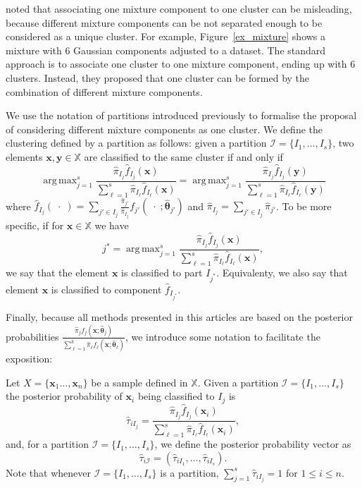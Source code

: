 \documentclass[10pt, a4paper]{article}
\DeclareMathOperator*{\argmax}{arg\,max}
\newcommand{\m}[1]{\boldsymbol{#1}}
\begin{document}
\cite{lee2004combining,hennig2010methods,baudry2010combining,melnykov2013distribution,pastore2013merging} noted that associating one mixture component to one cluster can be misleading, because different mixture components can be not separated enough to be considered as a unique cluster. For example, Figure~\ref{ex_mixture} shows  a mixture with 6 Gaussian components adjusted to a dataset. The standard approach is to associate one cluster to one mixture component, ending up with 6 clusters. Instead, they proposed that one cluster can be formed by the combination of different mixture components. 

We use the notation of partitions introduced previously to formalise the proposal of considering different mixture components as one cluster. We define the clustering defined by a partition as follows: given a partition $\mathcal{I} = \{ I_1, \dots, I_s\}$, two elements $\m x, \m y \in \mathbb{X}$ are classified to the same cluster if and only if
\begin{equation}\label{cluster_criteria}
\argmax_{j=1}^s \frac{ \hat{\pi}_{I_j} \hat{f}_{I_j}(\m x) }{\sum_{\ell=1}^s \hat{\pi}_{I_\ell} \hat{f}_{I_\ell}(\m x ) } = \argmax_{j=1}^s \frac{ \hat{\pi}_{I_j} \hat{f}_{I_j}(\m y) }{ \sum_{\ell=1}^s \hat{\pi}_{I_\ell} \hat{f}_{I_\ell}(\m y) }
\end{equation}
where $\hat{f}_{I_j}(\;\cdot\;) = \sum_{j' \in I_j} \frac{\hat{\pi}_{j'}}{\hat{\pi}_{I_j}} f_{j'}(\;\cdot\; ; \hat{\m\theta}_{j'})$ and $\hat{\pi}_{I_j} =  \sum_{j' \in I_j} \hat{\pi}_{j'}$. To be more specific,  if for $\m x \in \mathbb{X}$ we have
\[
j^* = \argmax_{j=1}^s \frac{ \hat{\pi}_{I_j} \hat{f}_{I_j}(\m x) }{\sum_{\ell=1}^s \hat{\pi}_{I_\ell} \hat{f}_{I_\ell}(\m x ) },
\]
we say that the element $\m x$ is classified to part $I_{j^*}$. Equivalenty, we also say that element $\m x$ is classified to component $\hat{f}_{I_{j^*}}$.

Finally, because all methods presented in this articles are based on the posterior probabilities $\frac{ \hat{\pi}_j f_j(\m x ; \hat{\m\theta}_j) }{\sum_{\ell=1}^k \hat{\pi}_\ell f_\ell(\m x ; \hat{\m\theta}_\ell) }$, we introduce some notation to facilitate the exposition:


Let $X = \{\m x_1\dots, \m x_n\}$ be a sample defined in $\mathbb{X}$. Given a partition $\mathcal{I} = \{ I_1, \dots, I_s \}$ the posterior probability  of $\m x_i$ being classified to $I_j$ is
\[
\hat{\tau}_{i I_j} =  \frac{ \hat{\pi}_{I_j} \hat{f}_{I_j}(\m x_i) }{\sum_{\ell=1}^s \hat{\pi}_{I_\ell} \hat{f}_{I_\ell}(\m x_i)},
\]
and, for a partition  $\mathcal{I} = \{ I_1, \dots, I_s\}$, we define the posterior probability vector as
\[
\hat{\tau}_{i \mathcal{I}} = \left( \hat{\tau}_{i I_1} , \dots, \hat{\tau}_{i I_s}  \right).
\]
Note that whenever  $\mathcal{I} = \{ I_1, \dots, I_s\}$ is a partition, $\sum_{j=1}^s \hat{\tau}_{i I_j} = 1$ for $1 \leq i \leq n$.
\end{document}
